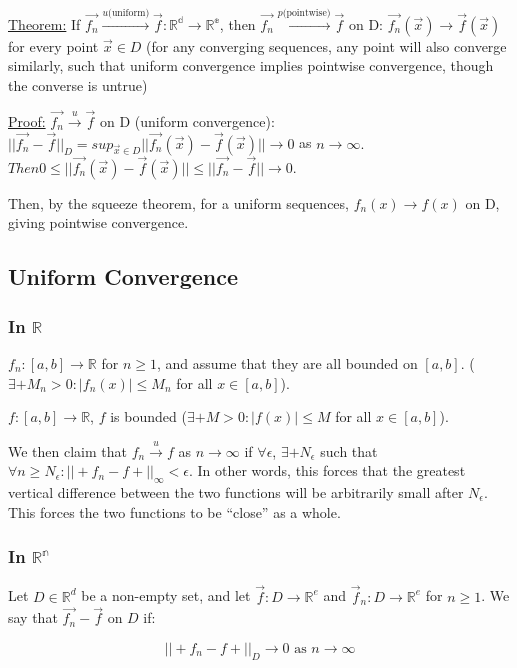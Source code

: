 \documentclass[11 pt, twoside]{article}
\begin{document}
\underline{Theorem:}
If $\vec{f_n} \overset{u \text{(uniform)}}{\to} \vec{f}: \mathbb{R^d} \to \mathbb{R^e}$, then $\vec{f_n} \overset{p \text{(pointwise)}}{\to} \vec{f}$ on D: $\vec{f_n}(\vec{x}) \to \vec{f}(\vec{x})$ for every point $\vec{x} \in D$ (for any converging sequences, any point will also converge similarly, such that uniform convergence implies pointwise convergence, though the converse is untrue)

\underline{Proof:}
$\vec{f_n} \overset{u}{\to} \vec{f}$ on D (uniform convergence): $||\vec{f_n} - \vec{f}||_D = sup_{\vec{x} \in D} ||\vec{f_n}(\vec{x}) - \vec{f}(\vec{x})|| \to 0$ as $n \to \infty.$ $Then 0 \leq ||\vec{f_n}(\vec{x}) - \vec{f}(\vec{x})|| \leq  ||\vec{f_n} - \vec{f}|| \to 0.$

Then, by the squeeze theorem, for a uniform sequences, $f_n(x) \to f(x)$ on D, giving pointwise convergence.

\subsection{Uniform Convergence}
\subsubsection{In $\mathbb{R}$}
$f_n : [a,b] \to \mathbb{R}$ for $n \geq 1$, and assume that they are all
bounded on $[a,b]$. ($\exists+ M_n > 0 : |f_n(x)| \leq M_n$ for all $x \in
[a,b]$).

$f:[a,b] \to \mathbb{R}$, $f$ is bounded ($\exists+ M > 0: |f(x)| \leq M$
for all $x \in [a,b]$).

We then claim that $f_n \overset{u}{\to} f$ as $n \to \infty$ if $\forall
\epsilon$, $\exists+ N_\epsilon$ such that $\forall n \geq
N_\epsilon : ||+f_n - f+||_\infty < \epsilon$. In other words, this
forces that the greatest vertical difference between the two functions will be
arbitrarily small after $N_\epsilon$. This forces the two functions to be
``close'' as a whole.

\subsubsection{In $\mathbb{R^n}$}

Let $D \in \mathbb{R}^d$ be a non-empty set, and let $\vec{f}:
D\to\mathbb{R}^e$ and $\vec{f}_n: D \to \mathbb{R}^e$ for $n \geq 1$. We
say that $\vec{f_n} - \vec{f}$ on $D$ if:

$$||+f_n - f+||_D \to 0 \text{ as } n \to \infty$$
\end{document}
